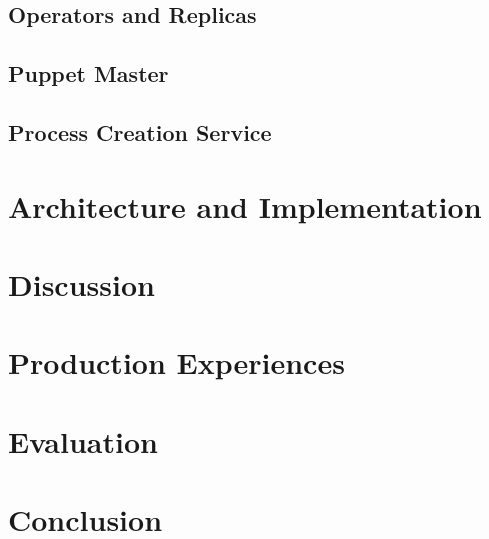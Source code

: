 \documentclass[times, 10pt, twocolumn]{article}
\begin{document}
\subsection{Operators and Replicas}







\subsection{Puppet Master}






\subsection{Process Creation Service}






\section{Architecture and Implementation}





\section{Discussion}




\section{Production Experiences}





\section{Evaluation}








\section{Conclusion}
\end{document}
